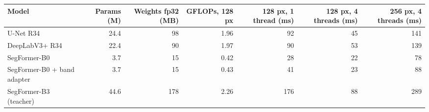 \begin{tabular}{lrrrrrr}
\toprule
Model & Params (M) & Weights fp32 (MB) & GFLOPs, 128 px & 128 px, 1 thread (ms) & 128 px, 4 threads (ms) & 256 px, 4 threads (ms) \\
\midrule
U-Net R34 & 24.4 & 98 & 1.96 & 92 & 45 & 141 \\
DeepLabV3+ R34 & 22.4 & 90 & 1.97 & 90 & 53 & 139 \\
SegFormer-B0 & 3.7 & 15 & 0.42 & 28 & 22 & 78 \\
SegFormer-B0 + band adapter & 3.7 & 15 & 0.43 & 41 & 23 & 88 \\
SegFormer-B3 (teacher) & 44.6 & 178 & 2.26 & 176 & 88 & 289 \\
\bottomrule
\end{tabular}
